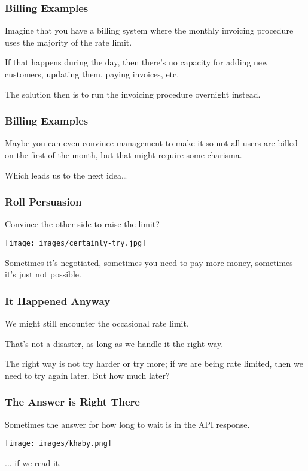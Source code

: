 \begin{frame}
\frametitle{Billing Examples}

Imagine that you have a billing system where the monthly invoicing procedure uses the majority of the rate limit. 

If that happens during the day, then there's no capacity for adding new customers, updating them, paying invoices, etc. 

The solution then is to run the invoicing procedure overnight instead.

\end{frame}

\begin{frame}
\frametitle{Billing Examples}

Maybe you can even convince management to make it so not all users are billed on the first of the month, but that might require some charisma.


Which leads us to the next idea\ldots

\end{frame}

\begin{frame}
\frametitle{Roll Persuasion}

Convince the other side to raise the limit?

\begin{center}
  \texttt{[image: images/certainly-try.jpg]}
\end{center}

Sometimes it's negotiated, sometimes you need to pay more money, sometimes it's just not possible.

\end{frame}

\begin{frame}
\frametitle{It Happened Anyway}

We might still encounter the occasional rate limit. 

That's not a disaster, as long as we handle it the right way. 

The right way is not try harder or try more; if we are being rate limited, then we need to try again later. But how much later?

\end{frame}

\begin{frame}
\frametitle{The Answer is Right There}

Sometimes the answer for how long to wait is in the API response.

\begin{center}
  \texttt{[image: images/khaby.png]}
\end{center}

... if we read it.

\end{frame}

